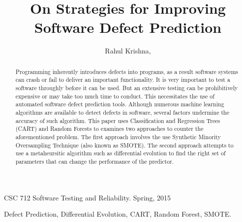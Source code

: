 \documentclass[12pt]{IEEEtran}
\begin{document}
  {CSC 712 Software Testing and Reliability. Spring, 
    2015}
  
  \title{On Strategies for Improving Software Defect Prediction}
  \author{Rahul Krishna, 
    }
 \maketitle 
    \begin{abstract}
      Programming inherently introduces defects into programs, as a result software systems can crash or fail to deliver an important functionality. It is very important to test a software throughly before it can be used. But an extensive testing can be prohibitively expensive or may take too much time to conduct. This necessitates the use of automated software defect prediction tools. Although numerous machine learning algorithms are available to detect defects in software, several factors undermine the accuracy of such algorithm. This paper uses Classification and Regression Trees (CART) and Random Forests to examines two approaches to counter the aforementioned problem. The first approach involves the use Synthetic Minority Oversampling Technique (also known as SMOTE). The second approach attempts to use a metaheursitic algorithm such as differential evolution to find the right set of parameters that can change the performance of the predictor. 
    \end{abstract}
    
    \begin{IEEEkeywords}
      Defect Prediction, Differential Evolution, CART, Random Forest, SMOTE.
    \end{IEEEkeywords}
\end{document}
